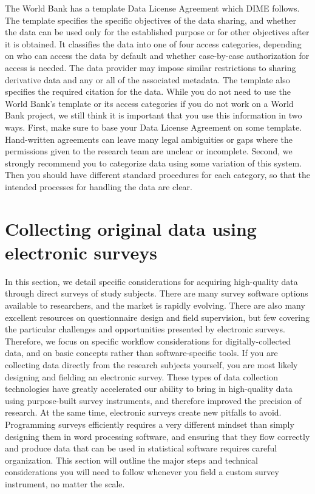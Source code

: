 The World Bank has a template Data License Agreement which DIME follows.
The template specifies the specific objectives of the data sharing,
and whether the data can be used only for the established purpose
or for other objectives after it is obtained.
It classifies the data into one of four access categories,
depending on who can access the data by default
and whether case-by-case authorization for access is needed.
The data provider may impose similar restrictions
to sharing derivative data and any or all of the associated metadata.
The template also specifies the required citation for the data.
While you do not need to use the World Bank's template
or its access categories if you do not work on a World Bank project,
we still think it is important that you use this information in two ways.
First, make sure to base your Data License Agreement on some template.
Hand-written agreements can leave many legal ambiguities or gaps
where the permissions given to the research team are unclear or incomplete.
Second, we strongly recommend you to categorize data using some variation of this system.
Then you should have different standard procedures for each category,
so that the intended processes for handling the data are clear.

\section{Collecting original data using electronic surveys}
In this section, we detail specific considerations
for acquiring high-quality data through direct surveys of study subjects.
There are many survey software options available to researchers,
and the market is rapidly evolving.
There are also many excellent resources on questionnaire design and field supervision,
but few covering the particular challenges and opportunities presented by electronic surveys.
Therefore, we focus on specific workflow considerations for digitally-collected data,
and on basic concepts rather than software-specific tools.
If you are collecting data directly from the research subjects yourself,
you are most likely designing and fielding an electronic survey.
These types of data collection technologies
have greatly accelerated our ability to bring in high-quality data
using purpose-built survey instruments,
and therefore improved the precision of research.
At the same time, electronic surveys create new pitfalls to avoid.
Programming surveys efficiently requires a very different mindset
than simply designing them in word processing software,
and ensuring that they flow correctly and produce data
that can be used in statistical software requires careful organization.
This section will outline the major steps and technical considerations
you will need to follow whenever you field a custom survey instrument,
no matter the scale.

